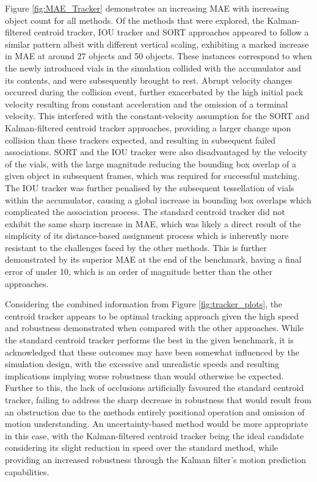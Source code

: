 \documentclass[10pt]{article}
\begin{document}
Figure \ref{fig:MAE_Tracker} demonstrates an increasing MAE with increasing object count for all methods. Of the methods that were explored, the Kalman-filtered centroid tracker, IOU tracker and SORT approaches appeared to follow a similar pattern albeit with different vertical scaling, exhibiting a marked increase in MAE at around 27 objects and 50 objects. These instances correspond to when the newly introduced vials in the simulation collided with the accumulator and its contents, and were subsequently brought to rest. Abrupt velocity changes occurred during the collision event, further exacerbated by the high initial pack velocity resulting from constant acceleration and the omission of a terminal velocity. This interfered with the constant-velocity assumption for the SORT and Kalman-filtered centroid tracker approaches, providing a larger change upon collision than these trackers expected, and resulting in subsequent failed associations. SORT and the IOU tracker were also disadvantaged by the velocity of the vials, with the large magnitude reducing the bounding box overlap of a given object in subsequent frames, which was required for successful matching. The IOU tracker was further penalised by the subsequent tessellation of vials within the accumulator, causing a global increase in bounding box overlaps which complicated the association process. The standard centroid tracker did not exhibit the same sharp increase in MAE, which was likely a direct result of the simplicity of its distance-based assignment process which is inherently more resistant to the challenges faced by the other methods. This is further demonstrated by its superior MAE at the end of the benchmark, having a final error of under 10, which is an order of magnitude better than the other approaches.

Considering the combined information from Figure \ref{fig:tracker_plots}, the centroid tracker appears to be optimal tracking approach given the high speed and robustness demonstrated when compared with the other approaches. While the standard centroid tracker performs the best in the given benchmark, it is acknowledged that these outcomes may have been somewhat influenced by the simulation design, with the excessive and unrealistic speeds and resulting implications implying worse robustness than would otherwise be expected. Further to this, the lack of occlusions artificially favoured the standard centroid tracker, failing to address the sharp decrease in robustness that would result from an obstruction due to the methods entirely positional operation and omission of motion understanding. An uncertainty-based method would be more appropriate in this case, with the Kalman-filtered centroid tracker being the ideal candidate considering its slight reduction in speed over the standard method, while providing an increased robustness through the Kalman filter's motion prediction capabilities. 
\end{document}
